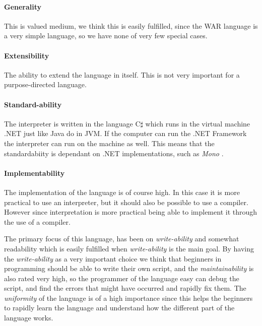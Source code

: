 \paragraph{Generality} This is valued medium, we think this is easily fulfilled, since the WAR language is a very simple language, so we have none of very few special cases.

\paragraph{Extensibility} The ability to extend the language in itself. This is not very important for a purpose-directed language.

\paragraph{Standard-ability} The interpreter is written in the language C$\sharp$ which runs in the virtual machine .NET just like Java do in JVM. If the computer can run the .NET Framework the interpreter can run on the machine as well. This means that the standardabiity is dependant on .NET implementations, such as \textit{Mono} \cite{CIL}.

\paragraph{Implementability} The implementation of the language is of course high. In this case it is more practical to use an interpreter, but it should also be possible to use a compiler. However since interpretation is more practical being able to implement it through the use of a compiler.


The primary focus of this language, has been on \textit{write-ability} and somewhat readability which is easily fulfilled when \textit{write-ability} is the main goal. By having the \textit{write-ability} as a very important choice we think that beginners in programming should be able to write their own script, and the \textit{maintainability} is also rated very high, so the programmer of the language easy can debug the script, and find the errors that might have occurred and rapidly fix them. The \textit{uniformity} of the language is of a high importance since this helps the beginners to rapidly learn the language and understand how the different part of the language works.


